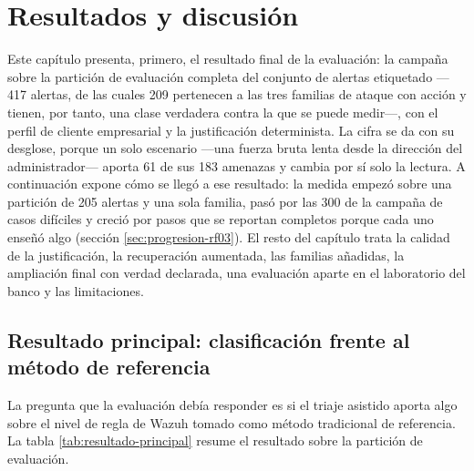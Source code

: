 
\chapter{Resultados y discusión}
\label{cap:resultados}

Este capítulo presenta, primero, el resultado final de la evaluación: la campaña sobre la partición
de evaluación completa del conjunto de alertas etiquetado ---417 alertas, de las cuales 209
pertenecen a las tres familias de ataque con acción y tienen, por tanto, una clase verdadera contra
la que se puede medir---, con el perfil de cliente empresarial y la justificación determinista. La
cifra se da con su desglose, porque un solo escenario ---una fuerza bruta lenta desde la dirección
del administrador--- aporta 61 de sus 183 amenazas y cambia por sí solo la lectura. A continuación
expone cómo se llegó a ese resultado: la medida empezó sobre una partición de 205 alertas y una sola
familia, pasó por las 300 de la campaña de casos difíciles y creció por pasos que se reportan
completos porque cada uno enseñó algo (sección \ref{sec:progresion-rf03}). El resto del capítulo
trata la calidad de la justificación, la recuperación aumentada, las familias añadidas, la
ampliación final con verdad declarada, una evaluación aparte en el laboratorio del banco y las
limitaciones.

\section{Resultado principal: clasificación frente al método de referencia}

La pregunta que la evaluación debía responder es si el triaje asistido aporta algo sobre el nivel
de regla de Wazuh tomado como método tradicional de referencia. La tabla
\ref{tab:resultado-principal} resume el resultado sobre la partición de evaluación.

